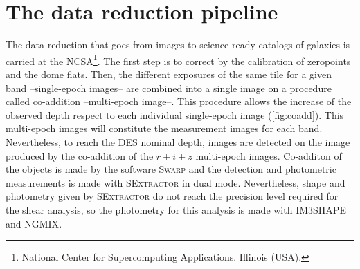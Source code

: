 \section{The data reduction pipeline}
The data reduction that goes from images to science-ready catalogs of galaxies is carried at the NCSA\footnote{National Center for Supercomputing Applications. Illinois (USA).}. The first step is to correct by the calibration of zeropoints and the dome flats. Then, the different exposures of the same tile for a given band --single-epoch images-- are combined into a single image on a procedure called co-addition --multi-epoch image--. This procedure allows the increase of the observed depth respect to each individual single-epoch image (\autoref{fig:coadd}). This multi-epoch images will constitute the measurement images for each band. Nevertheless, to reach the DES nominal depth, images are detected on the image produced by the co-addition of the $r+i+z$ multi-epoch images. Co-additon of the objects is made by the software {\scshape Swarp} and the detection and photometric measurements is made with {\scshape SExtractor} in dual mode. Nevertheless, shape and photometry given by {\scshape SExtractor} do not reach the precision level required for the shear analysis, so the photometry for this analysis is made with {\scshape IM3SHAPE} and {\scshape NGMIX}.
